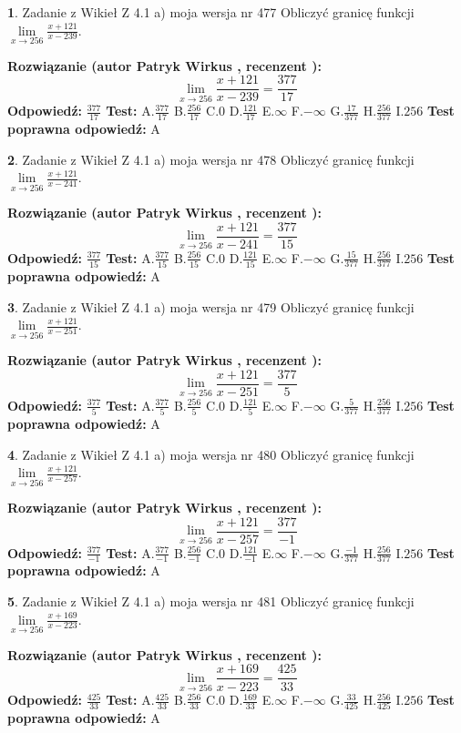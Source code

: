 \documentclass[12pt, a4paper]{article}
\theoremstyle{definition} %
\newtheorem{zad}{}
\newcommand{\zadStart}[1]{\begin{zad}#1\newline}
\newcommand{\zadStop}{\end{zad}}
\newcommand{\rozwStart}[2]{\noindent \textbf{Rozwiązanie (autor #1 , recenzent #2): }\newline}
\newcommand{\rozwStop}{\newline}
\newcommand{\odpStart}{\noindent \textbf{Odpowiedź:}\newline}
\newcommand{\odpStop}{\newline}
\newcommand{\testStart}{\noindent \textbf{Test:}\newline}
\newcommand{\testStop}{\newline}
\newcommand{\kluczStart}{\noindent \textbf{Test poprawna odpowiedź:}\newline}
\newcommand{\kluczStop}{\newline}
\begin{document}
\zadStart{Zadanie z Wikieł Z 4.1 a) moja wersja nr 477}
Obliczyć granicę funkcji $\lim\limits_{x\to256}\frac{x+121}{x-239}$.
\zadStop
\rozwStart{Patryk Wirkus}{}
$$\lim\limits_{x\to256}\frac{x+121}{x-239} = \frac{377}{17}$$
\rozwStop
\odpStart
$\frac{377}{17}$
\odpStop
\testStart
A.$\frac{377}{17}$
B.$\frac{256}{17}$
C.$0$
D.$\frac{121}{17}$
E.$\infty$
F.$-\infty$
G.$\frac{17}{377}$
H.$\frac{256}{377}$
I.$256$
\testStop
\kluczStart
A
\kluczStop



\zadStart{Zadanie z Wikieł Z 4.1 a) moja wersja nr 478}
Obliczyć granicę funkcji $\lim\limits_{x\to256}\frac{x+121}{x-241}$.
\zadStop
\rozwStart{Patryk Wirkus}{}
$$\lim\limits_{x\to256}\frac{x+121}{x-241} = \frac{377}{15}$$
\rozwStop
\odpStart
$\frac{377}{15}$
\odpStop
\testStart
A.$\frac{377}{15}$
B.$\frac{256}{15}$
C.$0$
D.$\frac{121}{15}$
E.$\infty$
F.$-\infty$
G.$\frac{15}{377}$
H.$\frac{256}{377}$
I.$256$
\testStop
\kluczStart
A
\kluczStop



\zadStart{Zadanie z Wikieł Z 4.1 a) moja wersja nr 479}
Obliczyć granicę funkcji $\lim\limits_{x\to256}\frac{x+121}{x-251}$.
\zadStop
\rozwStart{Patryk Wirkus}{}
$$\lim\limits_{x\to256}\frac{x+121}{x-251} = \frac{377}{5}$$
\rozwStop
\odpStart
$\frac{377}{5}$
\odpStop
\testStart
A.$\frac{377}{5}$
B.$\frac{256}{5}$
C.$0$
D.$\frac{121}{5}$
E.$\infty$
F.$-\infty$
G.$\frac{5}{377}$
H.$\frac{256}{377}$
I.$256$
\testStop
\kluczStart
A
\kluczStop



\zadStart{Zadanie z Wikieł Z 4.1 a) moja wersja nr 480}
Obliczyć granicę funkcji $\lim\limits_{x\to256}\frac{x+121}{x-257}$.
\zadStop
\rozwStart{Patryk Wirkus}{}
$$\lim\limits_{x\to256}\frac{x+121}{x-257} = \frac{377}{-1}$$
\rozwStop
\odpStart
$\frac{377}{-1}$
\odpStop
\testStart
A.$\frac{377}{-1}$
B.$\frac{256}{-1}$
C.$0$
D.$\frac{121}{-1}$
E.$\infty$
F.$-\infty$
G.$\frac{-1}{377}$
H.$\frac{256}{377}$
I.$256$
\testStop
\kluczStart
A
\kluczStop



\zadStart{Zadanie z Wikieł Z 4.1 a) moja wersja nr 481}
Obliczyć granicę funkcji $\lim\limits_{x\to256}\frac{x+169}{x-223}$.
\zadStop
\rozwStart{Patryk Wirkus}{}
$$\lim\limits_{x\to256}\frac{x+169}{x-223} = \frac{425}{33}$$
\rozwStop
\odpStart
$\frac{425}{33}$
\odpStop
\testStart
A.$\frac{425}{33}$
B.$\frac{256}{33}$
C.$0$
D.$\frac{169}{33}$
E.$\infty$
F.$-\infty$
G.$\frac{33}{425}$
H.$\frac{256}{425}$
I.$256$
\testStop
\kluczStart
A
\kluczStop
\end{document}

